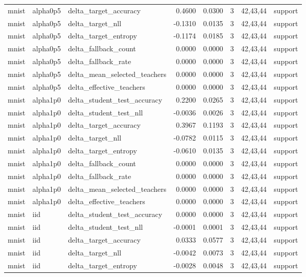 \begin{tabular}{lllrrrll}
mnist & alpha0p5 & delta\_target\_accuracy & 0.4600 & 0.0300 & 3 & 42,43,44 & support \\
mnist & alpha0p5 & delta\_target\_nll & -0.1310 & 0.0135 & 3 & 42,43,44 & support \\
mnist & alpha0p5 & delta\_target\_entropy & -0.1174 & 0.0185 & 3 & 42,43,44 & support \\
mnist & alpha0p5 & delta\_fallback\_count & 0.0000 & 0.0000 & 3 & 42,43,44 & support \\
mnist & alpha0p5 & delta\_fallback\_rate & 0.0000 & 0.0000 & 3 & 42,43,44 & support \\
mnist & alpha0p5 & delta\_mean\_selected\_teachers & 0.0000 & 0.0000 & 3 & 42,43,44 & support \\
mnist & alpha0p5 & delta\_effective\_teachers & 0.0000 & 0.0000 & 3 & 42,43,44 & support \\
mnist & alpha1p0 & delta\_student\_test\_accuracy & 0.2200 & 0.0265 & 3 & 42,43,44 & support \\
mnist & alpha1p0 & delta\_student\_test\_nll & -0.0036 & 0.0026 & 3 & 42,43,44 & support \\
mnist & alpha1p0 & delta\_target\_accuracy & 0.3967 & 0.1193 & 3 & 42,43,44 & support \\
mnist & alpha1p0 & delta\_target\_nll & -0.0782 & 0.0115 & 3 & 42,43,44 & support \\
mnist & alpha1p0 & delta\_target\_entropy & -0.0610 & 0.0135 & 3 & 42,43,44 & support \\
mnist & alpha1p0 & delta\_fallback\_count & 0.0000 & 0.0000 & 3 & 42,43,44 & support \\
mnist & alpha1p0 & delta\_fallback\_rate & 0.0000 & 0.0000 & 3 & 42,43,44 & support \\
mnist & alpha1p0 & delta\_mean\_selected\_teachers & 0.0000 & 0.0000 & 3 & 42,43,44 & support \\
mnist & alpha1p0 & delta\_effective\_teachers & 0.0000 & 0.0000 & 3 & 42,43,44 & support \\
mnist & iid & delta\_student\_test\_accuracy & 0.0000 & 0.0000 & 3 & 42,43,44 & support \\
mnist & iid & delta\_student\_test\_nll & -0.0001 & 0.0001 & 3 & 42,43,44 & support \\
mnist & iid & delta\_target\_accuracy & 0.0333 & 0.0577 & 3 & 42,43,44 & support \\
mnist & iid & delta\_target\_nll & -0.0042 & 0.0073 & 3 & 42,43,44 & support \\
mnist & iid & delta\_target\_entropy & -0.0028 & 0.0048 & 3 & 42,43,44 & support \\

\end{tabular}
